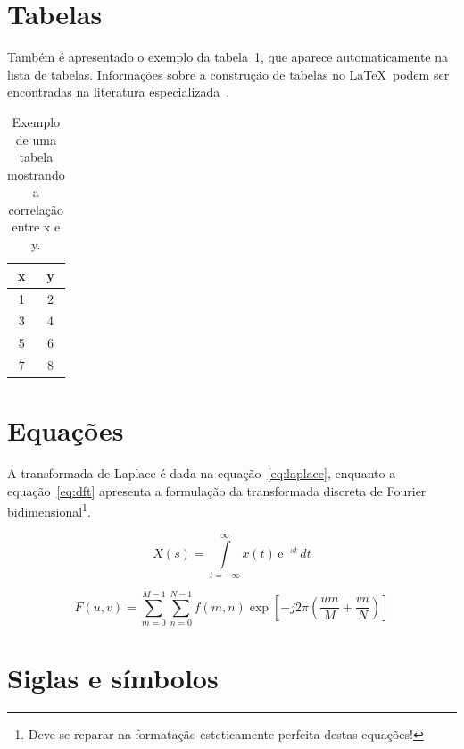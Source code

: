 \documentclass[openright]{normas-utf-tex} %
\begin{document}
\section{Tabelas}
\label{sec:tabelas}

Também é apresentado o exemplo da tabela~\ref{tab:correlacao}, que aparece automaticamente na lista de tabelas. Informações sobre a construção de tabelas no \LaTeX\ podem ser encontradas na literatura especializada~\cite{Lamport1986,Buerger1989,Kopka2003,Mittelbach2004}.

\begin{table}[!htb]
	\centering
	\caption[Exemplo de uma tabela]{Exemplo de uma tabela mostrando a correlação entre x e y.}
	\label{tab:correlacao}
	\begin{tabular}{cc}
		\hline
		x & y \\
		\hline
		1 & 2 \\
		3 & 4 \\
		5 & 6 \\
		7 & 8 \\
		\hline
	\end{tabular}
\end{table}



\section{Equações}
\label{sec:equacoes}

A transformada de Laplace é dada na equação~\eqref{eq:laplace}, enquanto a equação~\eqref{eq:dft} apresenta a formulação da transformada discreta de Fourier bidimensional\footnote{Deve-se reparar na formatação esteticamente perfeita destas equações!}.

\begin{equation}
X(s) = \int\limits_{t = -\infty}^{\infty} x(t) \, \text{e}^{-st} \, dt
\label{eq:laplace}
\end{equation}

\begin{equation}
F(u, v) = \sum_{m = 0}^{M - 1} \sum_{n = 0}^{N - 1} f(m, n) \exp \left[ -j 2 \pi \left( \frac{u m}{M} + \frac{v n}{N} \right) \right]
\label{eq:dft}
\end{equation}

\section{Siglas e símbolos}
\label{sec:siglasSimbolos}
\end{document}

